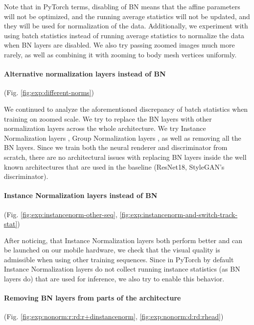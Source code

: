 Note that in PyTorch terms, disabling of BN means that the affine parameters will not be optimized, and the running average statistics will not be updated, and they will be used for normalization of the data. Additionally, we experiment with using batch statistics instead of running average statistics to normalize the data when BN layers are disabled. We also try passing zoomed images much more rarely, as well as combining it with zooming to body mesh vertices uniformly. 

\vspace{-15pt}\paragraph{Alternative normalization layers instead of BN}(Fig. \ref{fig:exp:different-norms})\mbox{}\nopagebreak

We continued to analyze the aforementioned discrepancy of batch statistics when training on zoomed scale. We try to replace the BN layers with other normalization layers across the whole architecture. We try Instance Normalization layers \cite{dnn:in16}, Group Normalization layers \cite{dnn:groupnorm18}, as well as removing all the BN layers. Since we train both the neural renderer and discriminator from scratch, there are no architectural issues with replacing BN layers inside the well known architectures that are used in the baseline (ResNet18, StyleGAN's discriminator).

\vspace{-15pt}\paragraph{Instance Normalization layers instead of BN}(Fig. \ref{fig:exp:instancenorm-other-seq}, \ref{fig:exp:instancenorm-and-switch-track-stat})\mbox{}\nopagebreak

After noticing, that Instance Normalization layers both perform better and can be launched on our mobile hardware, we check that the visual quality is admissible when using other training sequences. Since in PyTorch by default Instance Normalization layers do not collect running instance statistics (as BN layers do) that are used for inference, we also try to enable this behavior.

\vspace{-15pt}\paragraph{Removing BN layers from parts of the architecture}(Fig. \ref{fig:exp:nonorm:r:rd:r+dinstancenorm}, \ref{fig:exp:nonorm:d:rd:rhead})\mbox{}\nopagebreak

